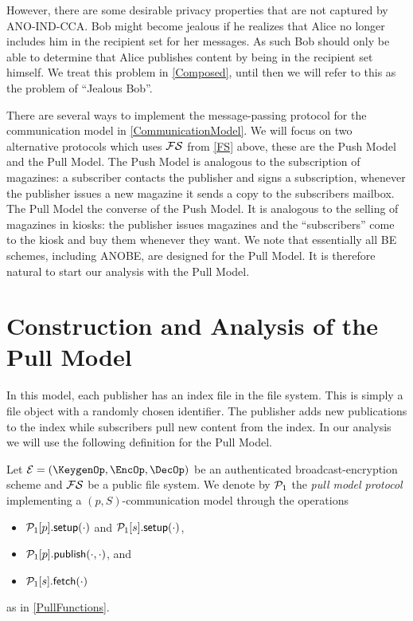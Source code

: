 However, there are some desirable privacy properties that are not captured by 
ANO-IND-CCA\@.
Bob might become jealous if he realizes that Alice no longer includes him in 
the recipient set for her messages.
As such Bob should only be able to determine that Alice publishes content by 
being in the recipient set himself.
We treat this problem in \cref{Composed}, until then we will refer to this as 
the problem of \enquote{Jealous Bob}.

There are several ways to implement the message-passing protocol for the 
communication model in \cref{CommunicationModel}.
We will focus on two alternative protocols which uses \(\FS\) from \cref{FS} 
above, these are the Push Model and the Pull Model.
The Push Model is analogous to the subscription of magazines:
a subscriber contacts the publisher and signs a subscription, whenever the 
publisher issues a new magazine it sends a copy to the subscribers mailbox.
The Pull Model the converse of the Push Model.
It is analogous to the selling of magazines in kiosks:
the publisher issues magazines and the \enquote{subscribers} come to the kiosk 
and buy them whenever they want.
We note that essentially all \ac{BE} schemes, including \ac{ANOBE}, are 
designed for the Pull Model.
It is therefore natural to start our analysis with the Pull Model.


\section{Construction and Analysis of the Pull Model}
\label{PullAnalysis}

In this model, each publisher has an index file in the file system.
This is simply a file object with a randomly chosen identifier.
The publisher adds new publications to the index while subscribers pull new 
content from the index.
In our analysis we will use the following definition for the Pull Model.

\begin{definition}\label{PullModel}
  Let \(\mathcal{E} = (\KeygenOp, \EncOp, \DecOp)\) be an authenticated 
  broadcast-encryption scheme and \(\FS\) be a public file system.
  We denote by \(\operatorname{\mathcal{P}_1}\) the \emph{pull model protocol} implementing a \((p, 
    S)\)-communication model through the operations
  \begin{itemize}
    \item \(\psetup{p}[\cdot]\) and \(\psetup{s}[\cdot]\),
    \item \(\ppub{p}[\cdot][\cdot]\), and
    \item \(\pget{s}[\cdot]\)
  \end{itemize}
  as in \cref{PullFunctions}.
\end{definition}

